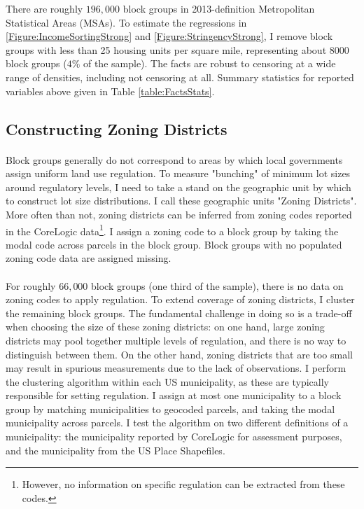 \documentclass[12pt]{article}
\begin{document}
	There are roughly $196,000$ block groups in 2013-definition Metropolitan Statistical Areas (MSAs). To estimate the  regressions in \ref{Figure:IncomeSortingStrong} and \ref{Figure:StringencyStrong}, I remove block groups with less than 25 housing units per square mile, representing about $8000$ block groups ($4 \%$ of the sample). The facts are robust to censoring at a wide range of densities, including not censoring at all. Summary statistics for reported variables above given in Table \ref{table:FactsStats}.
	
	
	\clearpage
	
	\subsection{Constructing Zoning Districts}\label{Appendix:ConstructZoningDistricts} 
	\paragraph*{}
	Block groups generally do not correspond to areas by which local governments assign uniform land use regulation. To measure "bunching" of minimum lot sizes around regulatory levels, I need to take a stand on the geographic unit by which to construct lot size distributions. I call these geographic units "Zoning Districts". More often than not, zoning districts can be inferred from zoning codes reported in the CoreLogic data\footnote{However, no information on specific regulation can be extracted from these codes.}. I assign a zoning code to a block group by taking the modal code across parcels in the block group. Block groups with no populated zoning code data are assigned missing. 
	 
	 \paragraph*{}
	 For roughly $66,000$ block groups (one third of the sample), there is no data on zoning codes to apply regulation. To extend coverage of zoning districts, I cluster the remaining block groups. The fundamental challenge in doing so is a trade-off when choosing the size of these zoning districts: on one hand, large zoning districts may pool together multiple levels of regulation, and there is no way to distinguish between them. On the other hand, zoning districts that are too small may result in spurious measurements due to the lack of observations. I perform the clustering algorithm within each US municipality, as these are typically responsible for setting regulation. I assign at most one municipality to a block group by matching municipalities to geocoded parcels, and taking the modal municipality across parcels. I test the algorithm on two different definitions of a municipality: the municipality reported by CoreLogic for assessment purposes, and the municipality from the US Place Shapefiles.
	
\end{document}
